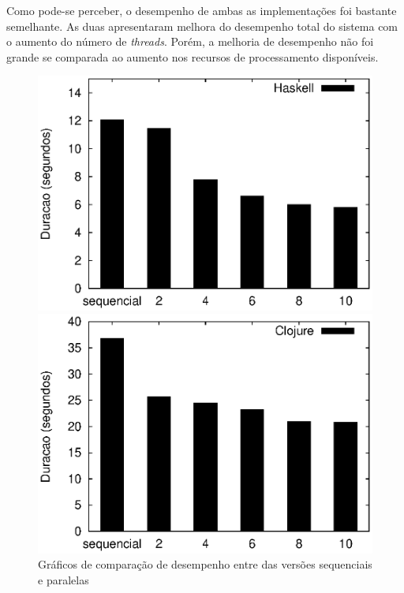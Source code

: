 Como pode-se perceber, o desempenho de ambas as implementações foi bastante semelhante. As duas apresentaram melhora do desempenho total do sistema com o aumento do número de \emph{threads}. Porém, a melhoria de desempenho não foi grande se comparada ao aumento nos recursos de processamento disponíveis. 

\begin{figure}[h]
 \begin{minipage}{0.5\textwidth}
  \centering
  \includegraphics[scale=0.63]{imagens/haskell.eps}
 \end{minipage}
 \begin{minipage}{0.5\textwidth}
  \includegraphics[scale=0.63]{imagens/clojure.eps}
 \end{minipage}
 \caption{Gráficos de comparação de desempenho entre das versões sequenciais e paralelas}
 \label{fig:clj-hs}
\end{figure}

